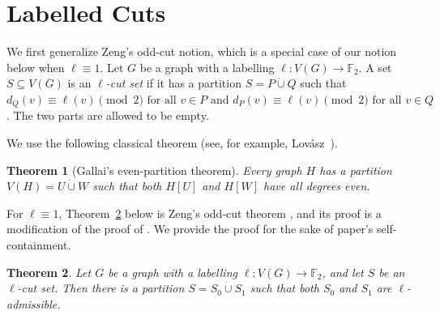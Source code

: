\documentclass[10pt,a4paper]{amsart}
\newtheorem{theorem}{Theorem}
\newcommand{\dotcupop}{\mathbin{\dot\cup}}
\newcommand{\F}{\mathbb{F}}
\newcommand{\1}{\mathbf{1}}
\begin{document}
	\section{Labelled Cuts}\label{sec:labelled}
	
	We first generalize Zeng's odd-cut notion, which is a special case of our notion below when $\ell\equiv 1$. Let $G$ be a graph with a labelling $\ell:V(G)\to\F_2$.  A set $S\subseteq V(G)$ is an \emph{$\ell$-cut set} if it has a partition $S=P\dotcupop Q$ such that $d_Q(v) \equiv \ell(v)\pmod 2 \mbox{ for all } v\in P \mbox{ and } d_P(v) \equiv \ell(v)\pmod 2 \mbox{ for all } v\in Q$. The two parts are allowed to be empty.
	
	
	We use the following classical theorem (see, for example,
	Lov\'asz~\cite[Problem~5.17]{Lovasz}).
	
	\begin{theorem}[Gallai's even-partition theorem]\label{thm:gallai}
		Every graph $H$ has a partition $V(H)=U\dotcupop W$ such that both $H[U]$
		and $H[W]$ have all degrees even.
	\end{theorem}
	
	For $\ell\equiv 1$, Theorem~\ref{thm:labelled-cut} below is Zeng's odd-cut theorem
	\cite[Theorem~1.2]{Zeng}, and its proof is a modification of the proof of \cite[Theorem~1.2]{Zeng}.
	We provide the proof for the sake of paper's self-containment. 
	
	\begin{theorem}\label{thm:labelled-cut}
		Let $G$ be a graph with a labelling $\ell:V(G)\to\F_2$, and let $S$ be an
		$\ell$-cut set.  Then there is a partition
		$
		S=S_0\dotcupop S_1
		$
		such that both $S_0$ and $S_1$ are $\ell$-admissible. 
	\end{theorem}
	
\end{document}

